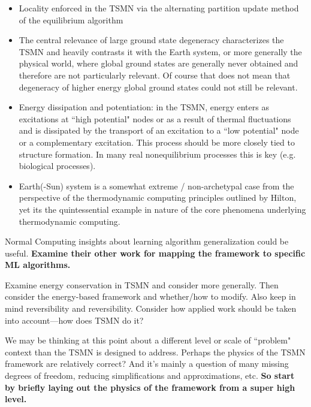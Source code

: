 \documentclass[12pt,letterpaper]{article}
\begin{document}
\begin{itemize}
\item Locality enforced in the TSMN via the alternating partition update method of the equilibrium algorithm
\item The central relevance of large ground state degeneracy characterizes the TSMN and heavily contrasts it with the Earth system, or more generally the physical world, where global ground states are generally never obtained and therefore are not particularly relevant. Of course that does not mean that degeneracy of higher energy global ground states could not still be relevant.
\item Energy dissipation and potentiation: in the TSMN, energy enters as excitations at ``high potential" nodes or as a result of thermal fluctuations and is dissipated by the transport of an excitation to a ``low potential" node or a complementary excitation. This process should be more closely tied to structure formation. In many real nonequilibrium processes this is key (e.g. biological processes).
\item Earth(-Sun) system is a somewhat extreme / non-archetypal case from the perspective of the thermodynamic computing principles outlined by Hilton, yet its the quintessential example in nature of the core phenomena underlying thermodynamic computing.
\end{itemize}

Normal Computing insights about learning algorithm generalization could be useful. \textbf{Examine their other work for mapping the framework to specific ML algorithms.}

Examine energy conservation in TSMN and consider more generally. Then consider the energy-based framework and whether/how to modify. Also keep in mind reversibility and reversibility. Consider how applied work should be taken into account---how does TSMN do it?

We may be thinking at this point about a different level or scale of ``problem" context than the TSMN is designed to address. Perhaps the physics of the TSMN framework are relatively correct? And it's mainly a question of many missing degrees of freedom, reducing simplifications and approximations, etc. \textbf{So start by briefly laying out the physics of the framework from a super high level.}
\end{document}
